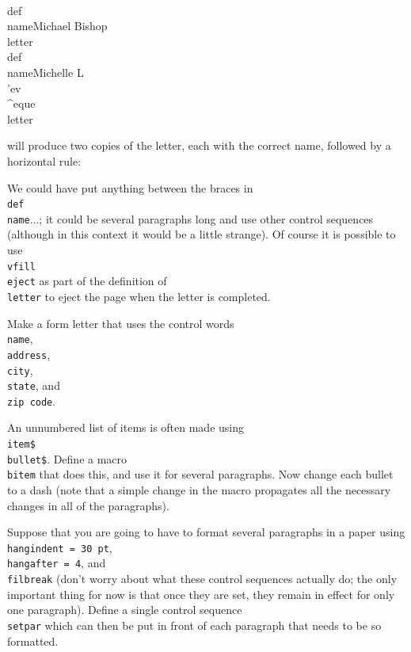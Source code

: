 \beginuser 
\\def\\name\lb Michael Bishop\rb 
\\letter 
\\def\\name\lb Michelle L\\'ev\\\^{}eque\rb 
\\letter 
\enduser 

\noindent will produce two copies of the letter, each with the 
correct name, followed by a horizontal rule: 

\def\name{Michael Bishop} 
\goodbreak 
\def\name{Michelle L\'ev\^eque} 

We could have put anything between the braces in 
{\tt \\def\\name\lb$\ldots$\rb}; it could be several paragraphs 
long and use other control sequences (although in this context it 
would be a little strange). Of course it is possible to use {\tt 
\\vfill \\eject} as part of the definition of {\tt \\letter} to 
eject the page when the letter is completed. 

\exercise Make a form letter that uses the control words {\tt \\name}, 
{\tt \\address}, {\tt \\city}, {\tt \\state}, and {\tt 
\\zip code}. 

\exercise An unnumbered list of items is often made 
using {\tt \\item\lb\$\\bullet\$\rb}.  Define a macro {\tt \\bitem} 
that does this, and use it for several paragraphs. Now change 
each bullet to a dash (note that a simple change in the macro 
propagates all the necessary changes in all of the paragraphs). 

\exercise Suppose that you are going to have to format several 
paragraphs in a paper using {\tt \\hangindent = 30 pt}, {\tt \\hangafter 
= 4}, and {\tt \\filbreak} (don't worry about what 
these control sequences actually do; the only important thing 
for now is that once they are set, they remain in effect for only 
one paragraph).  Define a single control sequence {\tt \\setpar} 
which can then be put in front of each paragraph that needs to be 
so formatted. 


